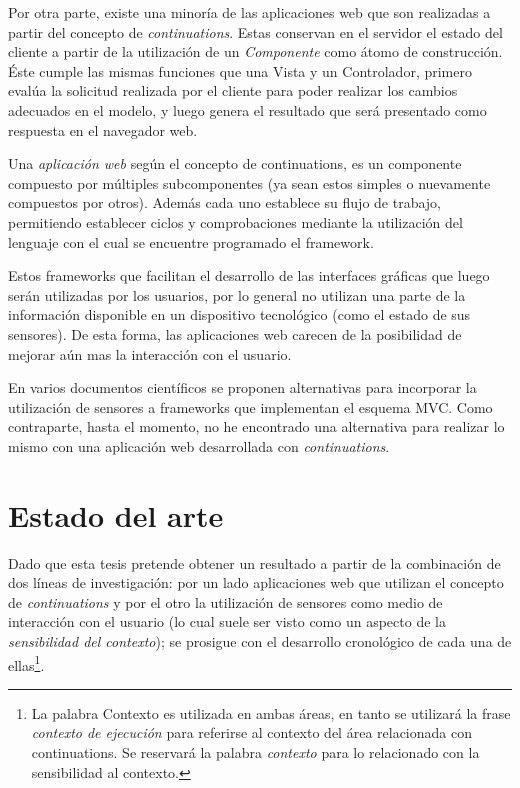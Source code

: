 Por otra parte, existe una minoría de las aplicaciones web que son realizadas a partir del concepto de \emph{continuations}. Estas conservan en el servidor el estado del cliente a partir de la utilización de un \emph{Componente} como átomo de construcción. Éste cumple las mismas funciones que una Vista y un Controlador, primero evalúa la solicitud realizada por el cliente para poder realizar los cambios adecuados en el modelo, y luego genera el resultado que será presentado como respuesta en el navegador web.

Una \emph{aplicación web} según el concepto de continuations, es un componente compuesto por múltiples subcomponentes (ya sean estos simples o nuevamente compuestos por otros). Además cada uno establece su flujo de trabajo, permitiendo establecer ciclos y comprobaciones mediante la utilización del lenguaje con el cual se encuentre programado el framework.

Estos frameworks que facilitan el desarrollo de las interfaces gráficas que luego serán utilizadas por los usuarios, por lo general no utilizan una parte de la información disponible en un dispositivo tecnológico (como el estado de sus sensores). De esta forma, las aplicaciones web carecen de la posibilidad de mejorar aún mas la interacción con el usuario.

En varios documentos científicos\cite{Challiol06,Fortier07,Challiol08,Kapitsaki09,Fortier09} se proponen alternativas para incorporar la utilización de sensores a frameworks que implementan el esquema MVC. Como contraparte, hasta el momento, no he encontrado una alternativa para realizar lo mismo con una aplicación web desarrollada con \emph{continuations}.


\section{Estado del arte}


Dado que esta tesis pretende obtener un resultado a partir de la combinación de dos líneas de investigación: por un lado aplicaciones web que utilizan el concepto de \emph{continuations} y por el otro la utilización de sensores como medio de interacción con el usuario (lo cual suele ser visto como un aspecto de la  \emph{sensibilidad del contexto}\cite{Schilit94}); se prosigue con el desarrollo cronológico de cada una de ellas\footnote{La palabra Contexto es utilizada en ambas áreas, en tanto se utilizará la frase \emph{contexto de ejecución} para referirse al contexto del área relacionada con continuations. Se reservará la palabra \emph{contexto} para lo relacionado con la sensibilidad al contexto.}.


